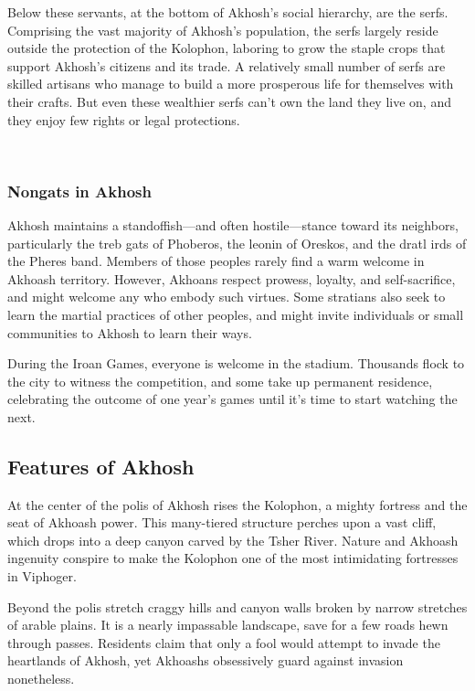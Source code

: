         Below these servants, at the bottom of Akhosh's social hierarchy, are the serfs.
        Comprising the vast majority of Akhosh's population, the serfs largely reside outside the protection of the Kolophon, laboring to grow the staple crops that support Akhosh's citizens and its trade.
        A relatively small number of serfs are skilled artisans who manage to build a more prosperous life for themselves with their crafts.
        But even these wealthier serfs can't own the land they live on, and they enjoy few rights or legal protections.

        \pagebreak~
        \vspace{12cm}

    \subsubsection{Nongats in Akhosh}
        Akhosh maintains a standoffish—and often hostile—stance toward its neighbors, particularly the treb gats of Phoberos, the leonin of Oreskos, and the dratl irds of the Pheres band.
        Members of those peoples rarely find a warm welcome in Akhoash territory.
        However, Akhoans respect prowess, loyalty, and self-sacrifice, and might welcome any who embody such virtues.
        Some stratians also seek to learn the martial practices of other peoples, and might invite individuals or small communities to Akhosh to learn their ways.

        During the Iroan Games, everyone is welcome in the stadium.
        Thousands flock to the city to witness the competition, and some take up permanent residence, celebrating the outcome of one year's games until it's time to start watching the next.

\subsection*{Features of Akhosh}
    At the center of the polis of Akhosh rises the Kolophon, a mighty fortress and the seat of Akhoash power.
    This many-tiered structure perches upon a vast cliff, which drops into a deep canyon carved by the Tsher River.
    Nature and Akhoash ingenuity conspire to make the Kolophon one of the most intimidating fortresses in Viphoger.

    Beyond the polis stretch craggy hills and canyon walls broken by narrow stretches of arable plains.
    It is a nearly impassable landscape, save for a few roads hewn through passes.
    Residents claim that only a fool would attempt to invade the heartlands of Akhosh, yet Akhoashs obsessively guard against invasion nonetheless.


